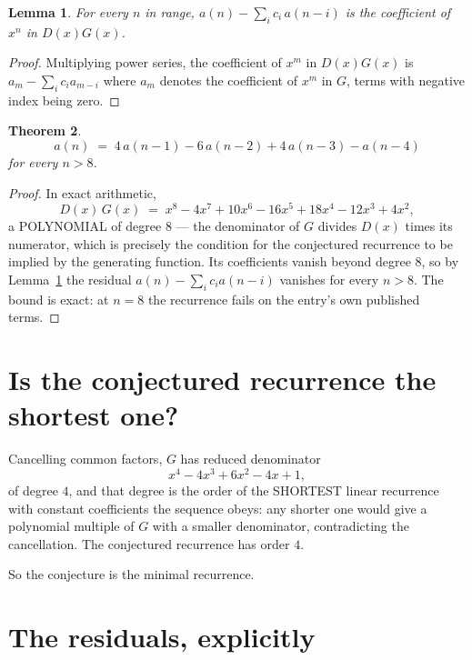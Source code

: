 \documentclass[11pt,a4paper]{article}
\theoremstyle{plain}
\newtheorem{theorem}{Theorem}
\newtheorem{lemma}[theorem]{Lemma}
\theoremstyle{definition}
\begin{document}
\begin{lemma}\label{lem:key}
For every $n$ in range, $a(n)-\sum_i c_i\,a(n-i)$ is the coefficient of $x^{n}$ in
$D(x)G(x)$.
\end{lemma}

\begin{proof}
Multiplying power series, the coefficient of $x^{m}$ in $D(x)G(x)$ is
$a_m-\sum_i c_i a_{m-i}$ where $a_m$ denotes the coefficient of $x^{m}$ in $G$, terms with
negative index being zero.
\end{proof}

\begin{theorem}
\[
a(n)\;=\;4\,a(n-1) - 6\,a(n-2) + 4\,a(n-3) - a(n-4)
\]
for every $n>8$.
\end{theorem}

\begin{proof}
In exact arithmetic,
\[
D(x)\,G(x)\;=\;x^{8} - 4 x^{7} + 10 x^{6} - 16 x^{5} + 18 x^{4} - 12 x^{3} + 4 x^{2},
\]
a POLYNOMIAL of degree $8$ --- the denominator of $G$ divides $D(x)$ times its numerator,
which is precisely the condition for the conjectured recurrence to be implied by the
generating function. Its coefficients vanish beyond degree $8$, so by
Lemma~\ref{lem:key} the residual $a(n)-\sum_ic_ia(n-i)$ vanishes for every
$n>8$. The bound is exact: at $n=8$ the recurrence fails on the entry's own published terms.
\end{proof}

\section{Is the conjectured recurrence the shortest one?}

Cancelling common factors, $G$ has reduced denominator
\[
x^{4} - 4 x^{3} + 6 x^{2} - 4 x + 1,
\]
of degree $4$, and that degree is the order of the SHORTEST linear recurrence with
constant coefficients the sequence obeys: any shorter one would give a polynomial multiple of
$G$ with a smaller denominator, contradicting the cancellation. The conjectured recurrence has
order $4$.

So the conjecture is the minimal recurrence.

\section{The residuals, explicitly}
\end{document}
